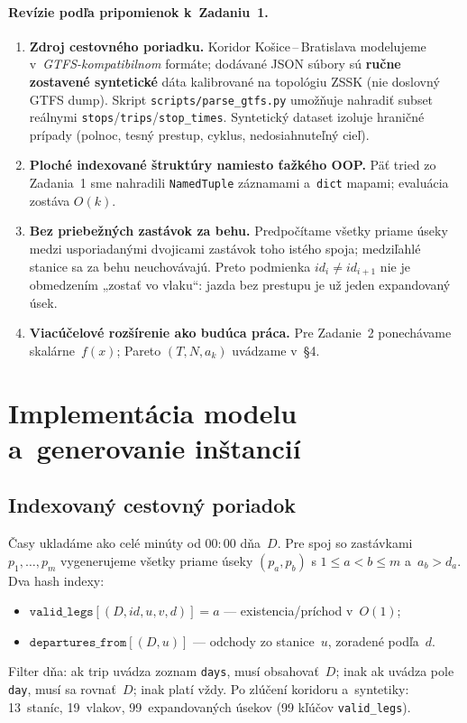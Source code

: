 \documentclass[11pt,a4paper]{article}
\begin{document}
\paragraph{Revízie podľa pripomienok k~Zadaniu~1.}
\begin{enumerate}[label=\arabic*)]
  \item \textbf{Zdroj cestovného poriadku.}
        Koridor Košice\,--\,Bratislava modelujeme v~\emph{GTFS-kompatibilnom}
        formáte; dodávané JSON súbory sú \textbf{ručne zostavené syntetické}
        dáta kalibrované na topológiu ZSSK (nie doslovný GTFS dump).
        Skript \texttt{scripts/parse\_gtfs.py} umožňuje nahradiť subset
        reálnymi \texttt{stops}/\texttt{trips}/\texttt{stop\_times}.
        Syntetický dataset izoluje hraničné prípady (polnoc, tesný prestup,
        cyklus, nedosiahnuteľný cieľ).

  \item \textbf{Ploché indexované štruktúry namiesto ťažkého OOP.}
        Päť tried zo Zadania~1 sme nahradili \texttt{NamedTuple} záznamami
        a~\texttt{dict} mapami; evaluácia zostáva $O(k)$.

  \item \textbf{Bez priebežných zastávok za behu.}
        Predpočítame všetky priame úseky medzi usporiadanými dvojicami
        zastávok toho istého spoja; medziľahlé stanice sa za behu neuchovávajú.
        Preto podmienka $id_i\neq id_{i+1}$ nie je obmedzením „zostať vo vlaku``:
        jazda bez prestupu je už jeden expandovaný úsek.

  \item \textbf{Viacúčelové rozšírenie ako budúca práca.}
        Pre Zadanie~2 ponechávame skalárne~$f(x)$; Pareto $(T,N,a_k)$ uvádzame
        v~§4.
\end{enumerate}

\section{Implementácia modelu a~generovanie inštancií}

\subsection{Indexovaný cestovný poriadok}

Časy ukladáme ako celé minúty od $00{:}00$ dňa~$D$. Pre spoj so zastávkami
$p_1,\ldots,p_m$ vygenerujeme všetky priame úseky $(p_a,p_b)$ s
$1\le a<b\le m$ a~$a_b>d_a$. Dva hash indexy:
\begin{itemize}
  \item $\texttt{valid\_legs}[(D,id,u,v,d)]=a$ --- existencia/príchod v~$O(1)$;
  \item $\texttt{departures\_from}[(D,u)]$ --- odchody zo stanice~$u$,
        zoradené podľa~$d$.
\end{itemize}
Filter dňa: ak trip uvádza zoznam \texttt{days}, musí obsahovať~$D$;
inak ak uvádza pole \texttt{day}, musí sa rovnať~$D$; inak platí vždy.
Po zlúčení koridoru a~syntetiky: 13~staníc, 19~vlakov, 99~expandovaných
úsekov (99 kľúčov \texttt{valid\_legs}).
\end{document}

